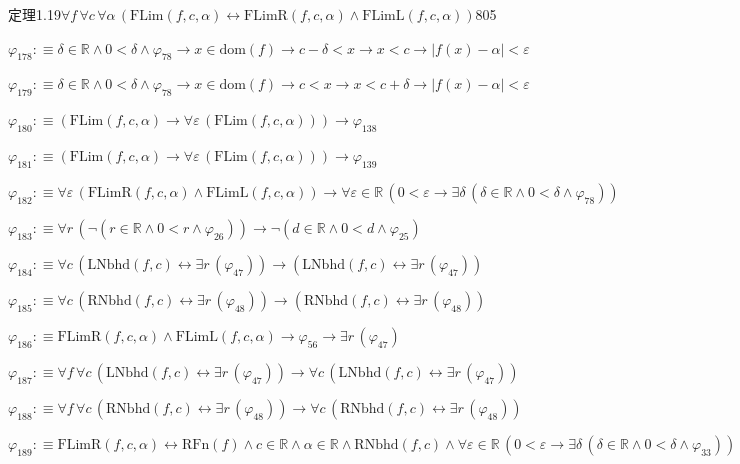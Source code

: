 \begin{fullproof}{定理1.19}{$\forall f\,\forall c\,\forall \alpha\,(\mathrm{FLim}(f,c,\alpha) \leftrightarrow \mathrm{FLimR}(f,c,\alpha) \land \mathrm{FLimL}(f,c,\alpha))$}{805}
\begin{abbrevlist}
\item $\varphi_{178} :\equiv \delta \in \mathbb{R} \land 0 < \delta \land \varphi_{78} \to x \in \mathrm{dom}(f) \to c - \delta < x \to x < c \to \lvert f(x) - \alpha \rvert < \varepsilon$
\item $\varphi_{179} :\equiv \delta \in \mathbb{R} \land 0 < \delta \land \varphi_{78} \to x \in \mathrm{dom}(f) \to c < x \to x < c + \delta \to \lvert f(x) - \alpha \rvert < \varepsilon$
\item $\varphi_{180} :\equiv (\mathrm{FLim}(f,c,\alpha) \to \forall \varepsilon\,(\mathrm{FLim}(f,c,\alpha))) \to \varphi_{138}$
\item $\varphi_{181} :\equiv (\mathrm{FLim}(f,c,\alpha) \to \forall \varepsilon\,(\mathrm{FLim}(f,c,\alpha))) \to \varphi_{139}$
\item $\varphi_{182} :\equiv \forall \varepsilon\,(\mathrm{FLimR}(f,c,\alpha) \land \mathrm{FLimL}(f,c,\alpha)) \to \forall \varepsilon \in \mathbb{R}\,(0 < \varepsilon \to \exists \delta\,(\delta \in \mathbb{R} \land 0 < \delta \land \varphi_{78}))$
\item $\varphi_{183} :\equiv \forall r\,(\neg (r \in \mathbb{R} \land 0 < r \land \varphi_{26})) \to \neg (d \in \mathbb{R} \land 0 < d \land \varphi_{25})$
\item $\varphi_{184} :\equiv \forall c\,(\mathrm{LNbhd}(f,c) \leftrightarrow \exists r\,(\varphi_{47})) \to (\mathrm{LNbhd}(f,c) \leftrightarrow \exists r\,(\varphi_{47}))$
\item $\varphi_{185} :\equiv \forall c\,(\mathrm{RNbhd}(f,c) \leftrightarrow \exists r\,(\varphi_{48})) \to (\mathrm{RNbhd}(f,c) \leftrightarrow \exists r\,(\varphi_{48}))$
\item $\varphi_{186} :\equiv \mathrm{FLimR}(f,c,\alpha) \land \mathrm{FLimL}(f,c,\alpha) \to \varphi_{56} \to \exists r\,(\varphi_{47})$
\item $\varphi_{187} :\equiv \forall f\,\forall c\,(\mathrm{LNbhd}(f,c) \leftrightarrow \exists r\,(\varphi_{47})) \to \forall c\,(\mathrm{LNbhd}(f,c) \leftrightarrow \exists r\,(\varphi_{47}))$
\item $\varphi_{188} :\equiv \forall f\,\forall c\,(\mathrm{RNbhd}(f,c) \leftrightarrow \exists r\,(\varphi_{48})) \to \forall c\,(\mathrm{RNbhd}(f,c) \leftrightarrow \exists r\,(\varphi_{48}))$
\item $\varphi_{189} :\equiv \mathrm{FLimR}(f,c,\alpha) \leftrightarrow \mathrm{RFn}(f) \land c \in \mathbb{R} \land \alpha \in \mathbb{R} \land \mathrm{RNbhd}(f,c) \land \forall \varepsilon \in \mathbb{R}\,(0 < \varepsilon \to \exists \delta\,(\delta \in \mathbb{R} \land 0 < \delta \land \varphi_{33}))$

\end{abbrevlist}
\end{fullproof}
